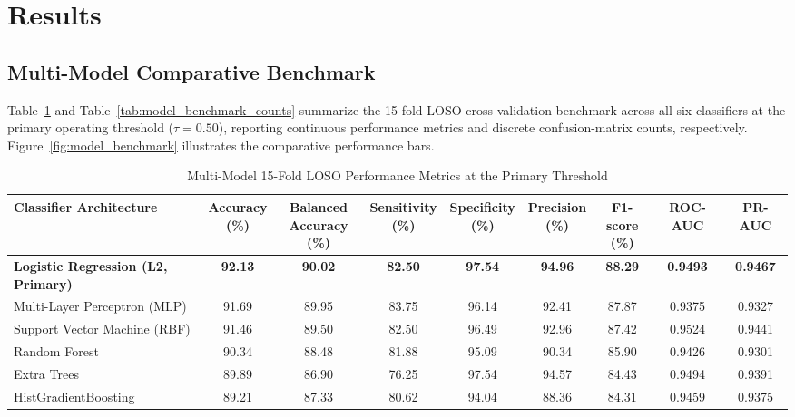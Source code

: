 \documentclass[conference]{IEEEtran}
\begin{document}
\section{Results}
\label{sec:results}

\subsection{Multi-Model Comparative Benchmark}
Table~\ref{tab:model_benchmark_metrics} and Table~\ref{tab:model_benchmark_counts} summarize the 15-fold LOSO cross-validation benchmark across all six classifiers at the primary operating threshold ($\tau = 0.50$), reporting continuous performance metrics and discrete confusion-matrix counts, respectively. Figure~\ref{fig:model_benchmark} illustrates the comparative performance bars.

\renewcommand{\thetable}{\Roman{table}-A}
\begin{table}[t]
\centering
\caption{Multi-Model 15-Fold LOSO Performance Metrics at the Primary Threshold}
\label{tab:model_benchmark_metrics}
\footnotesize
\setlength{\tabcolsep}{2.5pt}
\begin{tabular}{@{}lcccccccc@{}}
\toprule
\textbf{Classifier Architecture} & \shortstack{\textbf{Accuracy}\\\textbf{(\%)}} & \shortstack{\textbf{Balanced}\\\textbf{Accuracy (\%)}} & \shortstack{\textbf{Sensitivity}\\\textbf{(\%)}} & \shortstack{\textbf{Specificity}\\\textbf{(\%)}} & \shortstack{\textbf{Precision}\\\textbf{(\%)}} & \shortstack{\textbf{F1-score}\\\textbf{(\%)}} & \textbf{ROC-AUC} & \textbf{PR-AUC} \\
\midrule
\textbf{Logistic Regression (L2, Primary)} & \textbf{92.13} & \textbf{90.02} & \textbf{82.50} & \textbf{97.54} & \textbf{94.96} & \textbf{88.29} & \textbf{0.9493} & \textbf{0.9467} \\
Multi-Layer Perceptron (MLP) & 91.69 & 89.95 & 83.75 & 96.14 & 92.41 & 87.87 & 0.9375 & 0.9327 \\
Support Vector Machine (RBF) & 91.46 & 89.50 & 82.50 & 96.49 & 92.96 & 87.42 & 0.9524 & 0.9441 \\
Random Forest & 90.34 & 88.48 & 81.88 & 95.09 & 90.34 & 85.90 & 0.9426 & 0.9301 \\
Extra Trees & 89.89 & 86.90 & 76.25 & 97.54 & 94.57 & 84.43 & 0.9494 & 0.9391 \\
HistGradientBoosting & 89.21 & 87.33 & 80.62 & 94.04 & 88.36 & 84.31 & 0.9459 & 0.9375 \\
\bottomrule
\end{tabular}
\end{table}
\end{document}
